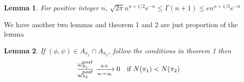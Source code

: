\documentclass[aoas,preprint]{imsart}
\newtheorem{lemma}{Lemma}
\begin{document}
\begin{lemma}
For positive integer $n$, $\sqrt{2\pi} n^{n + 1/2}e^{-n} \leq \Gamma(n + 1) \leq e n^{n + 1/2}e^{-n}$ 
\end{lemma}



We have another two lemmas and theorem 1 and 2 are just proportion of the lemma
\begin{lemma}
 If $(\phi, \psi) \in A_{\pi_1} \cap A_{\pi_2}$, follow the conditions in theorem 1 then 
 \begin{eqnarray*}
    \frac{\omega_{\pi_1}^{\text post}}{\omega_{\pi_2}^{\text post}} \xrightarrow[n\rightarrow\infty]{\text{a.s.}} 0 \quad \text{if } N(\pi_1) < N(\pi_2)\\
 \end{eqnarray*}
\end{lemma}
\end{document}
